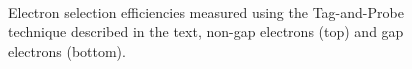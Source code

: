 \begin{figure}[!htb]
\begin{center}
    \\
\caption{Electron selection efficiencies measured using the Tag-and-Probe technique described in the text, non-gap electrons (top) and gap electrons (bottom).}
\label{fig:ele_sel_scale_factors}
\end{center}
\end{figure}



